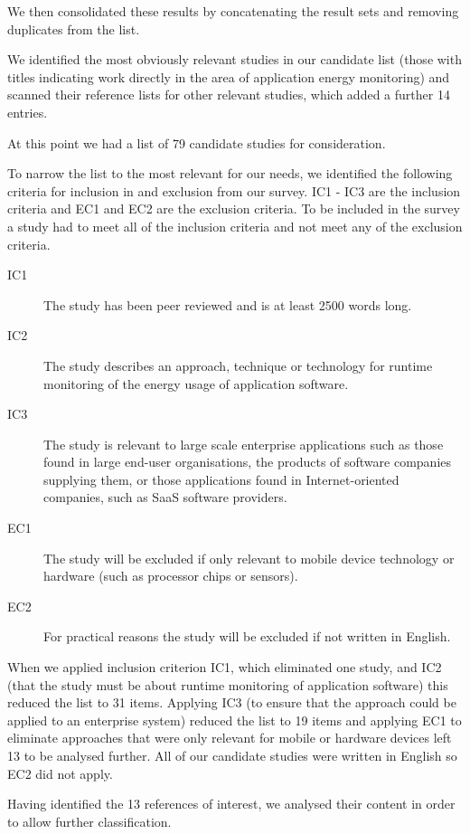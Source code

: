 We then consolidated these results by concatenating the result sets and removing duplicates from the list.

We identified the most obviously relevant studies in our candidate list (those with titles indicating work directly in the area of application energy monitoring) and scanned their reference lists for other relevant studies, which added a further 14 entries.

At this point we had a list of 79 candidate studies for consideration.

To narrow the list to the most relevant for our needs, we identified the following criteria for inclusion in and exclusion from our survey.  IC1 - IC3 are the inclusion criteria and EC1 and EC2 are the exclusion criteria.  To be included in the survey a study had to meet all of the inclusion criteria and not meet any of the exclusion criteria.

\begin{description}
	\item[IC1] The study has been peer reviewed and is at least 2500 words long.
	\item[IC2] The study describes an approach, technique or technology for runtime monitoring of the energy usage of application software.
	\item[IC3] The study is relevant to large scale enterprise applications such as those found in large end-user organisations, the products of software companies supplying them, or those applications found in Internet-oriented companies, such as SaaS software providers.
	\item[EC1] The study will be excluded if only relevant to mobile device technology or hardware (such as processor chips or sensors).
	\item[EC2] For practical reasons the study will be excluded if not written in English.
\end{description}

When we applied inclusion criterion IC1, which eliminated one study, and IC2 (that the study must be about runtime monitoring of application software) this reduced the list to 31 items.  Applying IC3 (to ensure that the approach could be applied to an enterprise system) reduced the list to 19 items and applying EC1 to eliminate approaches that were only relevant for mobile or hardware devices left 13 to be analysed further.  All of our candidate studies were written in English so EC2 did not apply.

Having identified the 13 references of interest, we analysed their content in order to allow further classification.  

